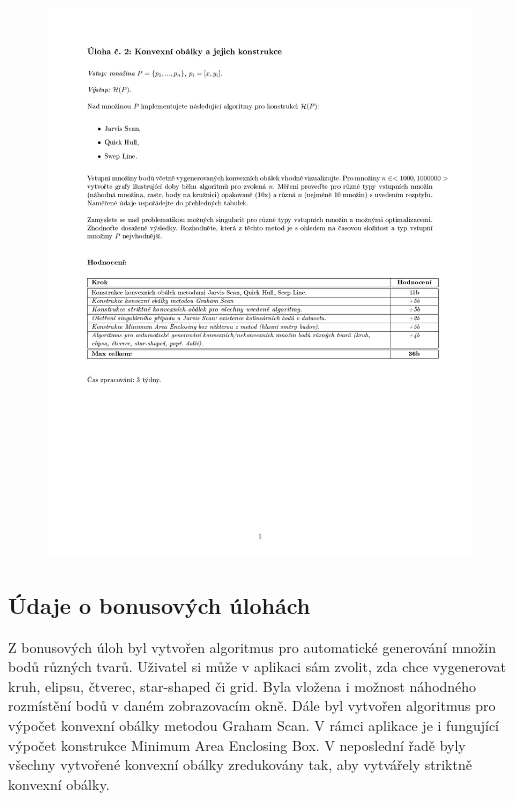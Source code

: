 \documentclass[a4paper, 12pt]{article}
\begin{document}
\begin{figure}[h!]
	\centering
	\includegraphics[clip, trim=0cm 10cm 0cm 3cm, width=1.2\textwidth]{zadani.pdf}
\end{figure}

\subsection{Údaje o bonusových úlohách}
Z bonusových úloh byl vytvořen algoritmus pro automatické generování množin bodů různých tvarů. Uživatel si může v aplikaci sám zvolit, zda chce vygenerovat kruh, elipsu, čtverec, star-shaped či grid. Byla vložena i možnost náhodného rozmístění bodů v daném zobrazovacím okně. Dále byl vytvořen algoritmus pro výpočet konvexní obálky metodou Graham Scan. V rámci aplikace je i fungující výpočet konstrukce Minimum Area Enclosing Box. V neposlední řadě byly všechny vytvořené konvexní obálky zredukovány tak, aby vytvářely striktně konvexní obálky.


\clearpage
\end{document}
